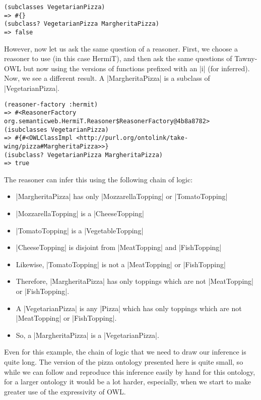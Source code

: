 \begin{verbatim}
(subclasses VegetarianPizza)
=> #{}
(subclass? VegetarianPizza MargheritaPizza)
=> false
\end{verbatim}

However, now let us ask the same question of a reasoner. First, we choose a
reasoner to use (in this case HermiT), and then ask the same questions of
Tawny-OWL but now using the versions of functions prefixed with an |i| (for
inferred). Now, we see a different result. A |MargheritaPizza| is a subclass
of |VegetarianPizza|.

\begin{verbatim}
(reasoner-factory :hermit)
=> #<ReasonerFactory org.semanticweb.HermiT.Reasoner$ReasonerFactory@4b8a8782>
(isubclasses VegetarianPizza)
=> #{#<OWLClassImpl <http://purl.org/ontolink/take-wing/pizza#MargheritaPizza>>}
(isubclass? VegetarianPizza MargheritaPizza)
=> true
\end{verbatim}

The reasoner can infer this using the following chain of logic:

\begin{itemize}
\item |MargheritaPizza| has only |MozzarellaTopping| or |TomatoTopping|
\item |MozzarellaTopping| is a |CheeseTopping|
\item |TomatoTopping| is a |VegetableTopping|
\item |CheeseTopping| is disjoint from |MeatTopping| and |FishTopping|
\item Likewise, |TomatoTopping| is not a |MeatTopping| or |FishTopping|
\item Therefore, |MargheritaPizza| has only toppings which are not
  |MeatTopping| or |FishTopping|.
\item A |VegetarianPizza| is any |Pizza| which has only toppings which are not
  |MeatTopping| or |FishTopping|.
\item So, a |MargheritaPizza| is a |VegetarianPizza|.
\end{itemize}

Even for this example, the chain of logic that we need to draw our inference
is quite long. The version of the pizza ontology presented here is quite
small, so while we can follow and reproduce this inference easily by hand for
this ontology, for a larger ontology it would be a lot harder, especially,
when we start to make greater use of the expressivity of OWL.

